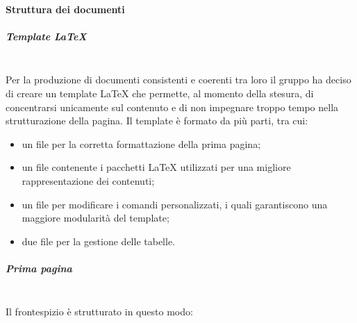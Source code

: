         \paragraph{Struttura dei documenti}
        \setlength{\parindent}{0cm}
            \subparagraph{Template \LaTeX}\mbox{}\\ [1mm]
                Per la produzione di documenti consistenti e coerenti tra loro il gruppo ha deciso di creare un template \LaTeX \xspace che permette, al momento della stesura, di concentrarsi unicamente sul contenuto e di non impegnare troppo tempo nella strutturazione della pagina. Il template è formato da
                più parti, tra cui:
                \begin{itemize}
                    \item un file per la corretta formattazione della prima pagina;
                    \item un file contenente i pacchetti \LaTeX \xspace utilizzati per una migliore rappresentazione dei contenuti;
                    \item un file per modificare i comandi personalizzati, i quali garantiscono una maggiore modularità del template;
                    \item due file per la gestione delle tabelle.
                \end{itemize}
            \subparagraph{Prima pagina}\mbox{}\\ [1mm]
                Il frontespizio è strutturato in questo modo:
